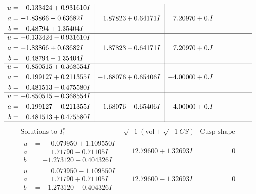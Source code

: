 \documentclass[1p]{elsarticle_modified}
\theoremstyle{definition}
\newcommand{\I}{\sqrt{-1}}
\begin{document}
$$\begin{array}{c|c|c}
\begin{aligned}
u &= -0.133424 + 0.931610 I \\
a &= -1.83866 - 0.63682 I \\
b &= \phantom{-}0.48794 + 1.35404 I\end{aligned}
 & \phantom{-}1.87823 + 0.64171 I & \phantom{-}7.20970 + 0. I\phantom{ +0.000000I} \\ \hline\begin{aligned}
u &= -0.133424 - 0.931610 I \\
a &= -1.83866 + 0.63682 I \\
b &= \phantom{-}0.48794 - 1.35404 I\end{aligned}
 & \phantom{-}1.87823 - 0.64171 I & \phantom{-}7.20970 + 0. I\phantom{ +0.000000I} \\ \hline\begin{aligned}
u &= -0.850515 + 0.368554 I \\
a &= \phantom{-}0.199127 + 0.211355 I \\
b &= \phantom{-}0.481513 - 0.475580 I\end{aligned}
 & -1.68076 + 0.65406 I & -4.00000 + 0. I\phantom{ +0.000000I} \\ \hline\begin{aligned}
u &= -0.850515 - 0.368554 I \\
a &= \phantom{-}0.199127 - 0.211355 I \\
b &= \phantom{-}0.481513 + 0.475580 I\end{aligned}
 & -1.68076 - 0.65406 I & -4.00000 + 0. I\phantom{ +0.000000I}\\
 \hline 
 \end{array}$$\newpage$$\begin{array}{c|c|c}  
\text{Solutions to }I^u_{1}& \I (\text{vol} + \sqrt{-1}CS) & \text{Cusp shape}\\
 \hline 
\begin{aligned}
u &= \phantom{-}0.079950 + 1.109550 I \\
a &= \phantom{-}1.71790 - 0.71105 I \\
b &= -1.273120 - 0.404326 I\end{aligned}
 & \phantom{-}12.79600 + 1.32693 I & \phantom{-0.000000 } 0 \\ \hline\begin{aligned}
u &= \phantom{-}0.079950 - 1.109550 I \\
a &= \phantom{-}1.71790 + 0.71105 I \\
b &= -1.273120 + 0.404326 I\end{aligned}
 & \phantom{-}12.79600 - 1.32693 I & \phantom{-0.000000 } 0 \\ \hline\begin{aligned}

\end{aligned}
\end{array}$$
\end{document}
